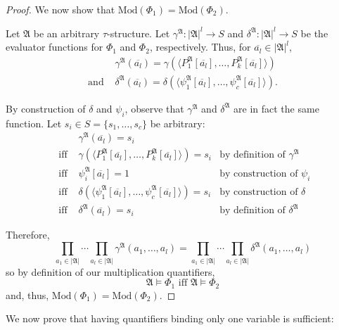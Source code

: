 \documentclass[a4paper,UKenglish,cleveref, autoref, thm-restate, anonymous]{lipics-v2021}
\begin{document}
\begin{proof}
    We now show that $\text{Mod}(\Phi_1) = \text{Mod}(\Phi_2)$.

    Let $\mathfrak{A}$ be an arbitrary $\tau$-structure. Let $\gamma^\mathfrak{A} : |\mathfrak{A}|^l \rightarrow S$ and $\delta^\mathfrak{A} : |\mathfrak{A}|^l \rightarrow S$ be the evaluator functions for $\Phi_1$ and $\Phi_2$, respectively. Thus, for $\overline{a_l} \in |\mathfrak{A}|^l$,
    \begin{align*}
        &\gamma^\mathfrak{A}(\overline{a_l}) = \gamma(\langle P^\mathfrak{A}_1[\overline{a_l}], \dots, P^\mathfrak{A}_k[\overline{a_l}]\rangle)\\
        \text{and }&\delta^\mathfrak{A}(\overline{a_l}) = \delta(\langle \psi^\mathfrak{A}_1[\overline{a_l}], \dots, \psi^\mathfrak{A}_c[\overline{a_l}]\rangle).
    \end{align*}

    \noindent By construction of $\delta$ and $\psi_i$, observe that $\gamma^\mathfrak{A}$ and $\delta^\mathfrak{A}$ are in fact the same function. Let $s_i \in S = \{s_1, \dots, s_c\}$ be arbitrary:
    \begin{align*}
        &\gamma^\mathfrak{A}(\overline{a_l}) = s_i \\
        \text{ iff } &\gamma(\langle P^\mathfrak{A}_1[\overline{a_l}], \dots, P^\mathfrak{A}_k[\overline{a_l}]\rangle) = s_i &\text{by definition of $\gamma^\mathfrak{A}$}\\
        \text{ iff } &\psi^\mathfrak{A}_i[\overline{a_l}] = 1 &\text{by construction of $\psi_i$}\\
        \text{ iff } &\delta(\langle \psi^\mathfrak{A}_1[\overline{a_l}], \dots, \psi^\mathfrak{A}_c[\overline{a_l}]\rangle) = s_i &\text{by construction of $\delta$}\\
        \text{ iff } &\delta^\mathfrak{A}(\overline{a_l}) = s_i &\text{by definition of $\delta^\mathfrak{A}$}
    \end{align*}
    
    \noindent Therefore, \[
        \prod_{a_1 \in |\mathfrak{A}|}\cdots\prod_{a_l \in |\mathfrak{A}|}\gamma^\mathfrak{A}(a_1,\dots,a_l) = \prod_{a_1 \in |\mathfrak{A}|}\cdots\prod_{a_l \in |\mathfrak{A}|}\delta^\mathfrak{A}(a_1,\dots,a_l)
    \] so by definition of our multiplication quantifiers, \[
        \mathfrak{A} \models \Phi_1 \text{ iff } \mathfrak{A} \models \Phi_2
    \] and, thus, $\text{Mod}(\Phi_1) = \text{Mod}(\Phi_2)$.
\end{proof}

We now prove that having quantifiers binding only one variable is sufficient:
\end{document}
